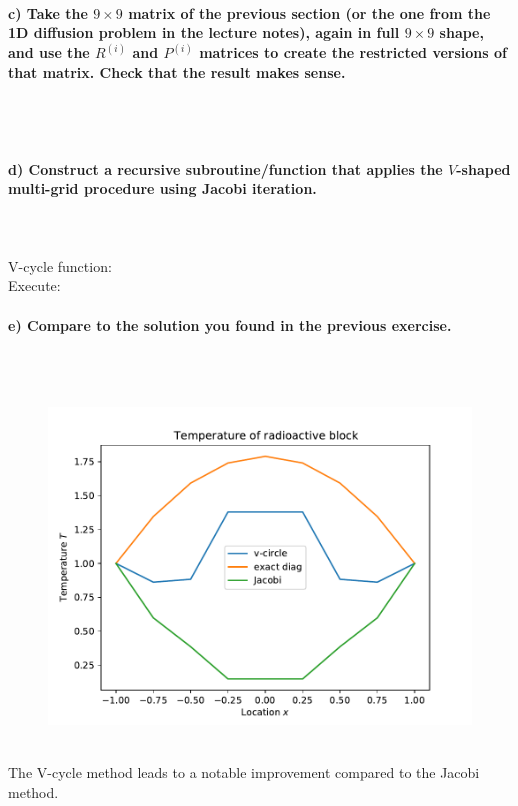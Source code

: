 \paragraph{
    c) Take the $9\times9$ matrix of the previous section (or the one
    from the 1D diffusion problem in the lecture notes), again in full
    $9\times9$ shape, and use the $R^{(i)}$ and $P^{(i)}$ matrices to
    create the restricted versions of that matrix.
    Check that the result makes sense.
} \ \\
    \\
    

\newpage
\paragraph{
    d) Construct a recursive subroutine/function that applies the
    $V$-shaped multi-grid procedure using Jacobi iteration.
} \ \\
    \\
    V-cycle function:
     \ \\
    Execute:
    

\newpage
\paragraph{
    e) Compare to the solution you found in the previous exercise.
} \ \\
    \\
    \begin{figure}[h!]
        \centering
        \includegraphics[width=.7\textwidth]{../figures/Aufg2e.pdf}
    \end{figure} \ \\ 
    The V-cycle method leads to a notable improvement compared to the 
    Jacobi method.

